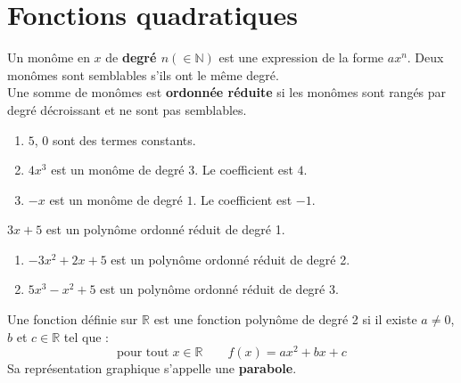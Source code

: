 \documentclass[main.tex]{subfiles}
\begin{document}
 
\cleardoublepage 
{}  
\pagestyle{scrheadings} %
\onehalfspacing 
\chapter{Fonctions quadratiques}

\begin{definition} Un monôme en $x$ de \textbf{degré $n(\in\mathbb{N})$} est une expression de la forme $ax^n$. 
Deux monômes sont semblables s'ils ont le même degré.\\
Une somme de monômes est \textbf{ordonnée réduite} si les monômes sont rangés par degré décroissant et ne sont pas semblables.  
\end{definition}
\begin{example} 
	\begin{enumerate}[leftmargin=*, label=\textbullet]
		\item   $5$, $0$ sont des termes constants.  
	\item   $4x^3$ est un monôme de degré $3$. Le coefficient est $4$.
	\item   $-x$ est un monôme de degré $1$. Le coefficient est $-1$.
\end{enumerate} 
\end{example}
\begin{example}  $3x+5$ est un polynôme ordonné réduit de degré 1.  
\begin{enumerate}[leftmargin=*, label=\textbullet]
	\item $-3x^2+2x+5$ est un polynôme ordonné réduit de degré 2.
	\item $5x^3-x^2+5$ est un polynôme ordonné réduit de degré 3.
\end{enumerate} 
\end{example} 
\begin{definition} Une fonction	définie sur $\mathbb{R}$ 
est une fonction polynôme de degré 2 
	si il existe $a\neq0$, $b$ et $c\in\mathbb{R}$ tel que : 
	\setlength{\abovedisplayskip}{3pt}
	\setlength{\belowdisplayskip}{3pt}
	$$\text{pour tout} \;x\in\mathbb{R} \qquad f(x)=ax^2+bx+c$$   
Sa représentation graphique s'appelle une \textbf{parabole}.
\end{definition} 
\end{document}
